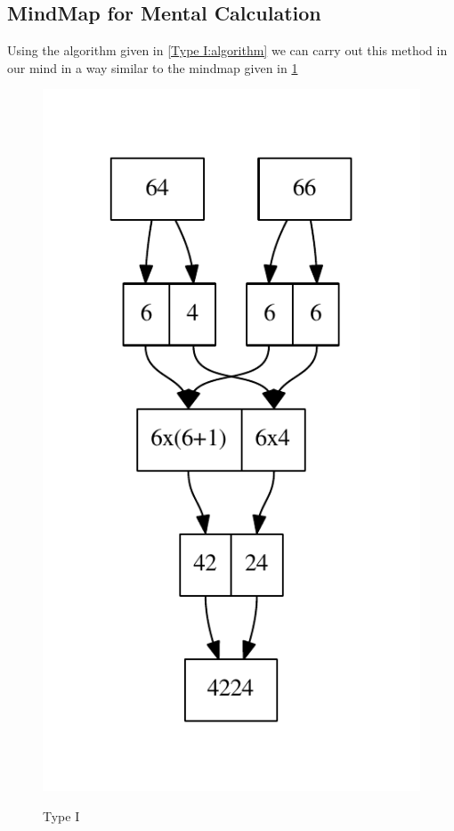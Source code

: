 \documentclass{article}
\begin{document}
\subsection{MindMap for Mental Calculation}
Using the algorithm given in \ref{Type I:algorithm} we can carry out this method in our mind in a way similar to the mindmap given in \ref{Figure1}
\newpage
\begin{figure}[h]
	\label{Figure1}
	\centering
	\includegraphics[scale=1]{g1.pdf} \\
	\caption{Type I}
\end{figure}
\newpage
\end{document}

